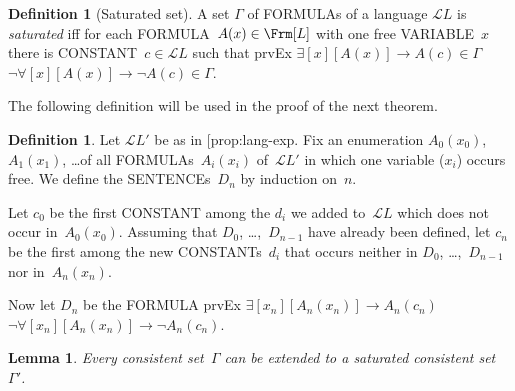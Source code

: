 \documentclass[10pt,a4paper]{article}
\makeatletter
\newcommand*{\olup}[1]{\MakeUppercase{#1}}
\theoremstyle{plain}
\newtheorem{lem}[thm]{Lemma}
\theoremstyle{definition}
\newtheorem{defn}[thm]{Definition}
\theoremstyle{remark}
\newcommand*{\ollabel}[1]{\label{#1}}
\newcommand{\olref}{\@ifnextchar[{\olref@i}{\olref@final}}
\def\olref@i[#1]{\@ifnextchar[{\olref@ii}{\olref@final}}
\def\olref@ii[#1]{\@ifnextchar[{\olref@iii}{\olref@final}}
\def\olref@iii[#1]{\olref@final}
\def\olref@final#1{\ref{#1}}
\providecommand{\lif}{\mathbin{\rightarrow}}
\providecommand{\lforall}{\mathord{\forall}}
\providecommand{\lexists}{\mathord{\exists}}
\providecommand{\Obj}{}
\providecommand{\Lang}{\ensuremath{\mathcal{L}}}
\providecommand{\iftag}[1]{#1}
\providecommand{\iftag}{}
\makeatother
\begin{document}
\begin{defn}[Saturated set]
A set $\Gamma$ of \olup{formula}s of a language $\Lang {L}$ is
\emph{saturated} iff for each \olup{formula}~$A(x) \in \Frm[L]$ with one
free \olup{variable}~$x$ there is \olup{constant}~$c \in \Lang{L}$ such
that
\iftag{prvEx}
      {$\lexists[x][A(x)] \lif A(c) \in \Gamma$}
      {$\lnot\lforall[x][A(x)] \lif \lnot A(c) \in \Gamma$}.
\end{defn}

The following definition will be used in the proof of the next theorem.

\begin{defn}
\ollabel{defn:henkin-exp}
Let $\Lang L'$ be as in \olref{prop:lang-exp}.  Fix an enumeration
$A_0(x_0)$, $A_1(x_1)$, \dots of all \olup{formula}s~$A_i(x_i)$
of~$\Lang L'$ in which one variable ($x_i$) occurs free.  We define
the \olup{sentence}s~$D_n$ by induction on~$n$.

Let $c_0$ be the first \olup{constant} among the $\Obj d_i$ we added
to~$\Lang{L}$ which does not occur in~$A_0(x_0)$.  Assuming that
$D_0$, \dots,~$D_{n-1}$ have already been defined, let $c_n$ be the
first among the new \olup{constant}s~$\Obj d_i$ that occurs neither in
$D_0$, \dots,~$D_{n-1}$ nor in~$A_n(x_n)$.

Now let $D_{n}$ be the \olup{formula} \iftag{prvEx}
{$\lexists[x_{n}][A_{n}(x_{n})] \lif
  A_{n}(c_{n})$}{$\lnot\lforall[x_{n}][A_{n}(x_{n})] \lif \lnot
  A_{n}(c_{n})$}.
\end{defn}

\begin{lem}
\ollabel{lem:henkin}
Every consistent set~$\Gamma$ can be extended to a saturated
consistent set~$\Gamma'$.
\end{lem}
\end{document}
